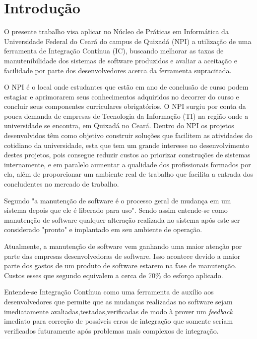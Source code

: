 \chapter*[Introdução]{Introdução}

O presente trabalho visa aplicar no Núcleo de Práticas em Informática da Universidade Federal do Ceará do campus de Quixadá (NPI) a utilização de uma ferramenta de Integração Contínua (IC), buscando melhorar as taxas de manutenibilidade dos sistemas de software produzidos e avaliar a aceitação e facilidade por parte dos desenvolvedores acerca da ferramenta supracitada.

O NPI é o local onde estudantes que estão em ano de conclusão de curso podem estagiar e aprimorarem seus conhecimentos adquiridos no decorrer do curso e concluir seus componentes curriculares obrigatórios. O NPI surgiu por conta da pouca demanda de empresas de Tecnologia da Informação (TI) na região onde a universidade se encontra, em Quixadá no Ceará. Dentro do NPI os projetos desenvolvidos têm como objetivo construir soluções que facilitem as atividades do cotidiano da universidade, esta que tem um grande interesse no desenvolvimento destes projetos, pois consegue reduzir custos ao priorizar construções de sistemas internamente, e em paralelo aumentar a qualidade dos profissionais formados por ela, além de proporcionar um ambiente real de trabalho que facilita a entrada dos concludentes no mercado de trabalho. \cite{npi2013}

Segundo  "a manutenção de software é o processo geral de mudança em um sistema depois que ele é liberado para uso". Sendo assim entende-se como manutenção de software  qualquer alteração realizada no sistema após este ser considerado "pronto" e implantado em seu ambiente de operação.

Atualmente, a manutenção de software vem ganhando uma maior atenção por parte das empresas desenvolvedoras de software. Isso acontece devido a maior parte dos gastos de um produto de software estarem na fase de manutenção. Custos esses que segundo  equivalem a  cerca de 70\% do esforço aplicado.

Entende-se Integração Contínua como uma ferramenta de auxílio aos desenvolvedores que permite que as mudanças realizadas no software sejam imediatamente avaliadas,testadas,verificadas de modo à prover um  \textit{feedback} imediato para correção de possíveis erros de integração que somente seriam verificados futuramente após problemas mais complexos de integração\cite{paul2007}.

